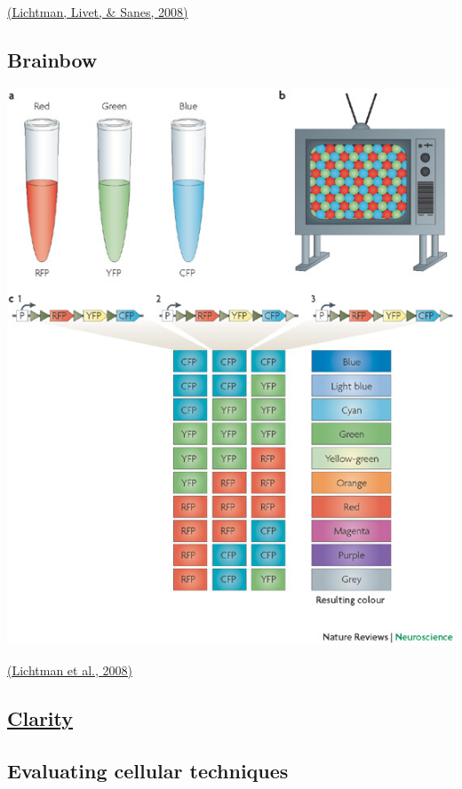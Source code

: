 \documentclass[]{article}
\begin{document}
\href{http://doi.org/10.1038/nrn2391}{(Lichtman, Livet, \& Sanes, 2008)}

\hypertarget{brainbow-1}{%
\subsection{Brainbow}\label{brainbow-1}}

\begin{center}\includegraphics[width=550px]{img/lichtman-nrn2391-f2} \end{center}

\href{http://doi.org/10.1038/nrn2391}{(Lichtman et al., 2008)}

\hypertarget{clarity}{%
\subsection{\texorpdfstring{\href{http://clarityresourcecenter.com/CLARITY.html}{Clarity}}{Clarity}}\label{clarity}}

\hypertarget{evaluating-cellular-techniques}{%
\subsection{Evaluating cellular
techniques}\label{evaluating-cellular-techniques}}
\end{document}
